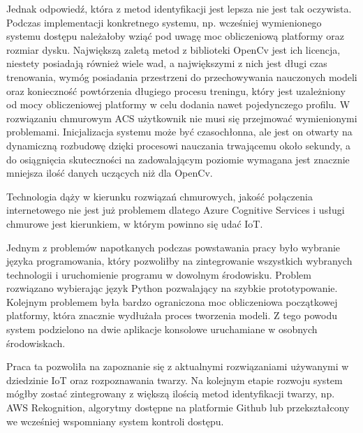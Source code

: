 Jednak odpowiedź, która z metod identyfikacji jest lepsza nie jest tak oczywista. Podczas implementacji konkretnego systemu, np. wcześniej wymienionego systemu dostępu należałoby wziąć pod uwagę moc obliczeniową platformy oraz rozmiar dysku. Największą zaletą metod z biblioteki OpenCv jest ich licencja, niestety posiadają również wiele wad, a największymi z nich jest długi czas trenowania, wymóg posiadania przestrzeni do przechowywania nauczonych modeli oraz konieczność powtórzenia długiego procesu treningu, który jest uzależniony od mocy obliczeniowej platformy w celu dodania nawet pojedynczego profilu. W rozwiązaniu chmurowym ACS użytkownik nie musi się przejmować wymienionymi problemami. Inicjalizacja systemu może być czasochłonna, ale jest on otwarty na dynamiczną rozbudowę dzięki procesowi nauczania trwającemu około sekundy, a do osiągnięcia skuteczności na zadowalającym poziomie wymagana jest znacznie mniejsza ilość danych uczących niż dla OpenCv. 

Technologia dąży w kierunku rozwiązań chmurowych, jakość połączenia internetowego nie jest już problemem dlatego Azure Cognitive Services i usługi chmurowe jest kierunkiem, w którym powinno się udać IoT.

Jednym z problemów napotkanych podczas powstawania pracy było wybranie języka programowania, który pozwoliłby na zintegrowanie wszystkich wybranych technologii i uruchomienie programu w dowolnym środowisku. Problem rozwiązano wybierając język Python pozwalający na szybkie prototypowanie. Kolejnym problemem była bardzo ograniczona moc obliczeniowa początkowej platformy, która znacznie wydłużała proces tworzenia modeli. Z tego powodu system podzielono na dwie aplikacje konsolowe uruchamiane w osobnych środowiskach.

Praca ta pozwoliła na zapoznanie się  z aktualnymi rozwiązaniami używanymi w dziedzinie IoT oraz rozpoznawania twarzy. Na kolejnym etapie rozwoju system mógłby zostać zintegrowany z większą ilością metod identyfikacji twarzy, np. AWS Rekognition, algorytmy dostępne na platformie Github lub przekształcony we wcześniej wspomniany system kontroli dostępu.

